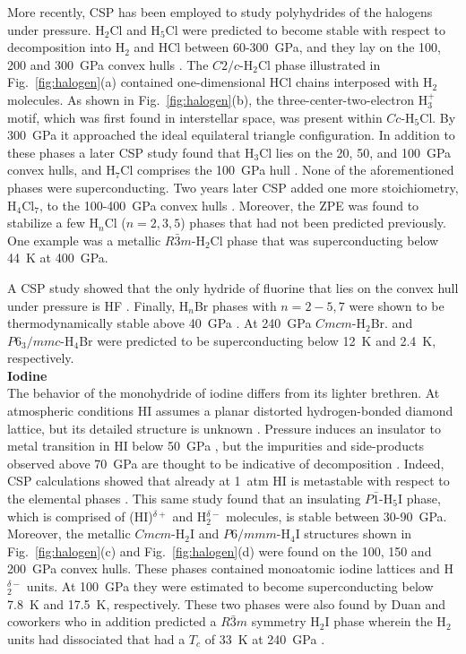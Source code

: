\documentclass[12pt,letterpaper,oneside]{article}
\begin{document}
%
More recently, CSP has been employed to study polyhydrides of the halogens under pressure. H$_2$Cl and H$_5$Cl were predicted to become stable with respect to decomposition into H$_2$ and HCl between 60-300~GPa, and they lay on the 100, 200 and 300~GPa convex hulls \cite{Wang:2015-17}. The $C2/c$-H$_2$Cl phase illustrated in Fig.\ \ref{fig:halogen}(a) contained one-dimensional HCl chains interposed with H$_2$ molecules.  As shown in Fig.\ \ref{fig:halogen}(b), the three-center-two-electron H$_3^+$ motif, which was first found in interstellar space, was present within $Cc$-H$_5$Cl. By 300~GPa it approached the ideal equilateral triangle configuration. In addition to these phases a later CSP study found that H$_3$Cl lies on the 20, 50, and 100~GPa convex hulls, and H$_7$Cl comprises the 100~GPa hull \cite{Duan:2015-F-Cl}. None of the aforementioned phases were superconducting. Two years later CSP added one more stoichiometry, H$_4$Cl$_7$, to the 100-400~GPa convex hulls \cite{Zeng:2017-Cl}. Moreover, the ZPE was found to stabilize a few H$_n$Cl ($n=2,3,5$) phases that had not been predicted previously. One example was a metallic $R\bar{3}m$-H$_2$Cl phase that was superconducting below 44~K at 400~GPa. 

A CSP study showed that the only hydride of fluorine that lies on the convex hull under pressure is HF \cite{Duan:2015-F-Cl}.
Finally, H$_n$Br phases with $n=2-5,7$ were shown to be thermodynamically stable above 40~GPa \cite{Duan:arxiv-Br}. At 240~GPa $Cmcm$-H$_2$Br.  and $P6_3/mmc$-H$_4$Br were predicted to be superconducting below 12~K and 2.4~K, respectively.\\


\noindent\textbf{Iodine} \\
%
The behavior of the monohydride of iodine differs from its lighter brethren. At atmospheric conditions HI assumes a planar distorted hydrogen-bonded diamond lattice, but its detailed structure is unknown \cite{Ikram:1993a}. Pressure induces an insulator to metal transition in HI below 50~GPa \cite{Straaten:1986a}, but the impurities and side-products observed above 70~GPa are thought to be indicative of decomposition \cite{Straaten:1988a}. Indeed, CSP calculations showed that already at 1~atm HI is metastable with respect to the elemental phases \cite{Shamp:2015}. This same study found that an insulating $P\bar{1}$-H$_5$I phase, which is comprised of  (HI)$^{\delta+}$ and H$_2^{\delta-}$ molecules, is stable between 30-90~GPa. Moreover, the metallic $Cmcm$-H$_2$I and  $P6/mmm$-H$_4$I structures shown in Fig.\ \ref{fig:halogen}(c) and Fig.\ \ref{fig:halogen}(d) were found on the 100, 150 and 200~GPa convex hulls. These phases contained monoatomic iodine lattices and H$_2^{\delta-}$ units. At 100~GPa they were estimated to become superconducting below 7.8~K and 17.5~K, respectively. These two phases were also found by Duan and coworkers who in addition predicted a $R\bar{3}m$ symmetry H$_2$I phase wherein the H$_2$ units had dissociated that had a $T_c$ of 33~K at 240~GPa \cite{Duan:2015-I}. 
\end{document}
